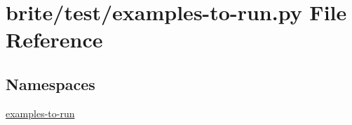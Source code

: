 \hypertarget{brite_2test_2examples-to-run_8py}{}\section{brite/test/examples-\/to-\/run.py File Reference}
\label{brite_2test_2examples-to-run_8py}
\subsection*{Namespaces}
\begin{DoxyCompactItemize}
\item 
 \hyperlink{namespaceexamples-to-run}{examples-\/to-\/run}
\end{DoxyCompactItemize}
